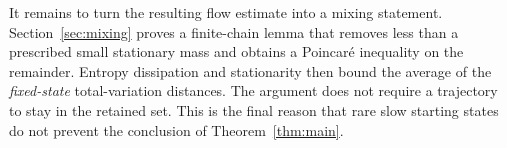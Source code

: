 It remains to turn the resulting flow estimate into a mixing statement.
Section~\ref{sec:mixing} proves a finite-chain lemma that removes less
than a prescribed small stationary mass and obtains a Poincar\'e
inequality on the remainder. Entropy dissipation and stationarity then
bound the average of the \emph{fixed-state} total-variation distances.
The argument does not require a trajectory to stay in the retained set.
This is the final reason that rare slow starting states do not prevent
the conclusion of Theorem~\ref{thm:main}.
